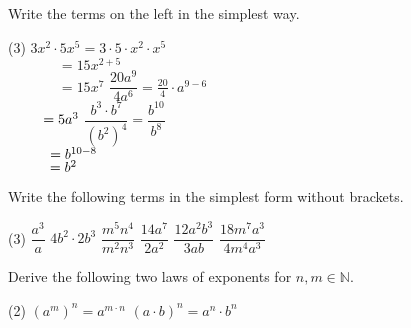 \begin{example}
	Write the terms on the left in the simplest way.
	\begin{tasks}(3)
		\task $3x^2\cdot 5x^5=3\cdot 5\cdot x^2\cdot x^5$ \\
		$\phantom{3x^2\cdot 5x^5}=15x^{2+5}$ \\
		$\phantom{3x^2\cdot 5x^5}=15x^7$
		\task $\dfrac{20a^9}{4a^6}=\frac{20}{4}\cdot a^{9-6}$ \\
		$\smash{\phantom{\dfrac{20a^9}{4a^6}}}=5a^3$
		\task $\dfrac{b^3\cdot b^7}{\left(b^2\right)^4}=\dfrac{b^{10}}{b^8}$ \\
		$\smash{\phantom{\dfrac{b^3\cdot b^7}{\left(b^2\right)^4}}}=b^{10-8}$ \\
		$\smash{\phantom{\dfrac{b^3\cdot b^7}{\left(b^2\right)^4}}}=b^2$ 
	\end{tasks}
\end{example}
\begin{exercise}
	Write the following terms in the simplest form without brackets.
	\begin{tasks}(3)
		\task $\dfrac{a^3}{a}$
		\task $4b^2\cdot 2b^3$
		\task $\dfrac{m^5n^4}{m^2n^3}$
		\task $\dfrac{14a^7}{2a^2}$
		\task $\dfrac{12a^2b^3}{3ab}$
		\task $\dfrac{18m^7a^3}{4m^4a^3}$
	\end{tasks}
\end{exercise}
\begin{exercise}
	Derive the following two laws of exponents for $n,m\in\mathbb N$.
	\begin{tasks}(2)
		\task $\left(a^m\right)^n=a^{m\cdot n}$
		\task $\left(a\cdot b\right)^n=a^n\cdot b^n$
	\end{tasks}
\end{exercise}
